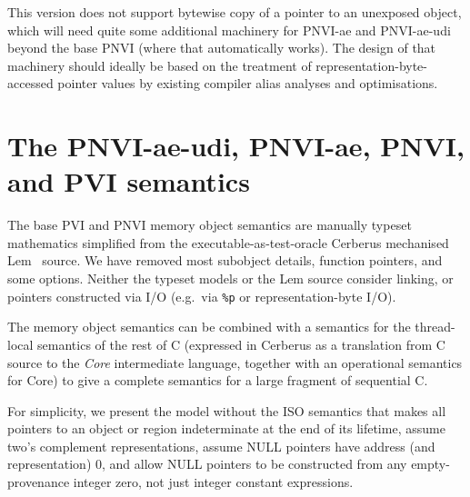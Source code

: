 \documentclass[acmsmall,review,screen]{acmart}\settopmatter{printfolios=true,printccs=false,printacmref=false}
\begin{document}
{\color{red}This version does not support bytewise copy of a pointer
 to an unexposed object, which will need quite some additional
 machinery for PNVI-ae and PNVI-ae-udi beyond the base PNVI (where
 that automatically works).  The design of that machinery should
 ideally be based on the treatment of representation-byte-accessed
 pointer values by existing compiler alias analyses and optimisations.}



\section{The PNVI-ae-udi, PNVI-ae, PNVI, and PVI semantics}

The base PVI and PNVI memory object semantics are manually typeset mathematics simplified from the
executable-as-test-oracle
Cerberus
mechanised Lem~\cite{Lem-icfp2014} source. We have removed most subobject details, function
pointers, and some options.  Neither the typeset models or
the Lem source consider linking, or pointers constructed via I/O
(e.g.~via
\texttt{\%p} or representation-byte I/O).

The memory object semantics can be combined with a semantics for the
thread-local semantics of the rest of C (expressed in Cerberus as a
translation from C source to the \emph{Core} intermediate language,
together with an operational semantics for Core) to give a complete
semantics for a large fragment of sequential C. 


For simplicity, we present the model without the ISO semantics that makes all
pointers to an object or region indeterminate at the end of its lifetime,
assume two's complement representations, assume NULL pointers have
address (and representation) $0$, and allow NULL pointers to be constructed from any
empty-provenance integer zero, not just integer constant expressions.
\end{document}
